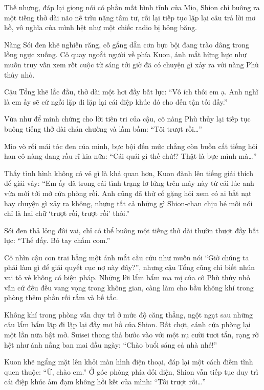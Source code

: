 \documentclass[../main.tex]{subfiles}
\begin{document}
Thế nhưng, đáp lại giọng nói có phần mất bình tĩnh của Mio, Shion chỉ buông ra một tiếng thở dài não nề trĩu nặng tâm tư, rồi lại tiếp tục lặp lại câu trả lời mơ hồ, vô nghĩa của mình hệt như một chiếc radio bị hỏng băng.


Nàng Sói đen khẽ nghiến răng, cố gắng dằn cơn bực bội đang trào dâng trong lồng ngực xuống. Cô quay ngoắt người về phía Kuon, ánh mắt hừng hực như muốn truy vấn xem rốt cuộc từ sáng tới giờ đã có chuyện gì xảy ra với nàng Phù thủy nhỏ.

Cậu Tổng khẽ lắc đầu, thở dài một hơi đầy bất lực: ``Vô ích thôi em ạ. Anh nghĩ là em ấy sẽ cứ ngồi lặp đi lặp lại cái điệp khúc đó cho đến tận tối đấy.''

Vừa như để minh chứng cho lời tiên tri của cậu, cô nàng Phù thủy lại tiếp tục buông tiếng thở dài chán chường và lầm bầm: ``Tôi trượt rồi\dots''

Mio vò rối mái tóc đen của mình, bực bội đến mức chẳng còn buồn cất tiếng hỏi han cô nàng đang rầu rĩ kia nữa: ``Cái quái gì thế chứ!? Thật là bực mình mà\dots''

Thấy tình hình không có vẻ gì là khả quan hơn, Kuon đành lên tiếng giải thích để giải vây: ``Em ấy đã trong cái tình trạng lơ lửng trên mây này từ cái lúc anh vừa mới tới mở cửa phòng rồi. Anh cũng đã thử cố gặng hỏi xem có ai bắt nạt hay chuyện gì xảy ra không, nhưng tất cả những gì Shion-chan chịu hé môi nói chỉ là hai chữ `trượt rồi, trượt rồi' thôi.''

Sói đen thả lỏng đôi vai, chỉ có thể buông một tiếng thở dài thườn thượt đầy bất lực: ``Thế đấy. Bó tay chấm com.''

Cô nhìn cậu con trai bằng một ánh mắt cầu cứu như muốn nói ``Giờ chúng ta phải làm gì để giải quyết cục nợ này đây?'', nhưng cậu Tổng cũng chỉ biết nhún vai tỏ vẻ không có biện pháp. Những lời lẩm bẩm ma mị của cô Phù thủy nhỏ vẫn cứ đều đều vang vọng trong không gian, càng làm cho bầu không khí trong phòng thêm phần rối rắm và bế tắc.

\ct

Không khí trong phòng vẫn duy trì ở mức độ căng thẳng, ngột ngạt sau những câu lẩm bẩm lặp đi lặp lại đầy mơ hồ của Shion. Bất chợt, cánh cửa phòng lại một lần nữa bật mở. Suisei thong thả bước vào với một nụ cười tươi tắn, rạng rỡ hệt như ánh nắng ban mai đầu ngày: ``Chào buổi sáng cả nhà nhé!''


Kuon khẽ ngẩng mặt lên khỏi màn hình điện thoại, đáp lại một cách điềm tĩnh quen thuộc: ``Ừ, chào em.'' Ở góc phòng phía đối diện, Shion vẫn tiếp tục duy trì cái điệp khúc ảm đạm không hồi kết của mình: ``Tôi trượt rồi\dots''
\end{document}
